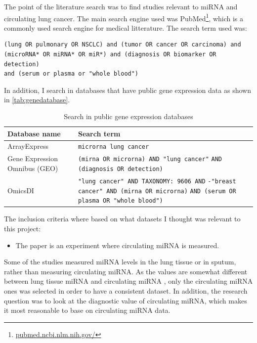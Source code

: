 The point of the literature search was to find studies relevant to miRNA and circulating lung cancer. The main search engine used was PubMed\footnote{\url{pubmed.ncbi.nlm.nih.gov/}}, which is a commonly used search engine for medical litterature. The search term used was:
\begin{verbatim}
(lung OR pulmonary OR NSCLC) and (tumor OR cancer OR carcinoma) and
(microRNA* OR miRNA* OR miR*) and (diagnosis OR biomarker OR detection)
and (serum or plasma or "whole blood")
\end{verbatim}
In addition, I search in databases that have public gene expression data as shown in \autoref{tab:genedatabase}.
\begin{table}[htbp]
\begin{center}
\begin{tabular}{|p{}|p{}|}\hline
Database name & Search term\\\hline
ArrayExpress\tablefootnote{\url{https://www.ebi.ac.uk/arrayexpress/}} & \verb|microrna lung cancer|\\\hline
Gene Expression Omnibus (GEO)\tablefootnote{\url{https://www.ncbi.nlm.nih.gov/gds}} & \verb|(mirna OR microrna) AND "lung cancer"| \verb|AND (diagnosis OR detection) |\\\hline
OmicsDI\tablefootnote{\url{https://www.omicsdi.org}} & \verb|"lung cancer" AND TAXONOMY: 9606 AND| \verb|-"breast cancer" AND (mirna OR microrna)| \verb|AND (serum OR plasma OR "whole blood")|\\\hline
\end{tabular}
\caption{Search in public gene expression databases}
\label{tab:genedatabase}
\end{center}
\end{table}

The inclusion criteria where based on what datasets I thought was relevant to this project:
\begin{itemize}
    \item The paper is an experiment where circulating miRNA is measured.
\end{itemize}
Some of the studies measured miRNA levels in the lung tissue or in sputum, rather than measuring circulating miRNA. As the values are somewhat different between lung tissue miRNA and circulating miRNA \citep{differentserumtissue}, only the circulating miRNA ones was selected in order to have a consistent dataset. In addition, the research question was to look at the diagnostic value of circulating miRNA, which makes it most reasonable to base on circulating miRNA data.

